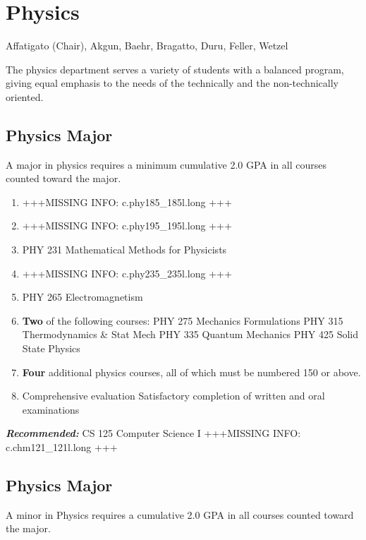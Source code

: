 \documentclass[
  letterpaper,
]{scrbook}
\begin{document}
\hypertarget{physics}{%
\section{Physics}\label{physics}}

Affatigato (Chair), Akgun, Baehr, Bragatto, Duru, Feller, Wetzel

The physics department serves a variety of students with a balanced
program, giving equal emphasis to the needs of the technically and the
non-technically oriented.

\hypertarget{physics-major}{%
\subsection{Physics Major}\label{physics-major}}

A major in physics requires a minimum cumulative 2.0 GPA in all courses
counted toward the major.

\begin{enumerate}
\def\labelenumi{\arabic{enumi}.}
\item
  +++MISSING INFO: c.phy185\_185l.long +++
\item
  +++MISSING INFO: c.phy195\_195l.long +++
\item
  PHY 231 Mathematical Methods for Physicists
\item
  +++MISSING INFO: c.phy235\_235l.long +++
\item
  PHY 265 Electromagnetism
\item
  \textbf{Two} of the following courses: PHY 275 Mechanics Formulations
  PHY 315 Thermodynamics \& Stat Mech PHY 335 Quantum Mechanics PHY 425
  Solid State Physics
\item
  \textbf{Four} additional physics courses, all of which must be
  numbered 150 or above.
\item
  Comprehensive evaluation Satisfactory completion of written and oral
  examinations
\end{enumerate}

\textbf{\emph{Recommended:}} CS 125 Computer Science I +++MISSING INFO:
c.chm121\_121l.long +++

\hypertarget{physics-major-1}{%
\subsection{Physics Major}\label{physics-major-1}}

A minor in Physics requires a cumulative 2.0 GPA in all courses counted
toward the major.
\end{document}

